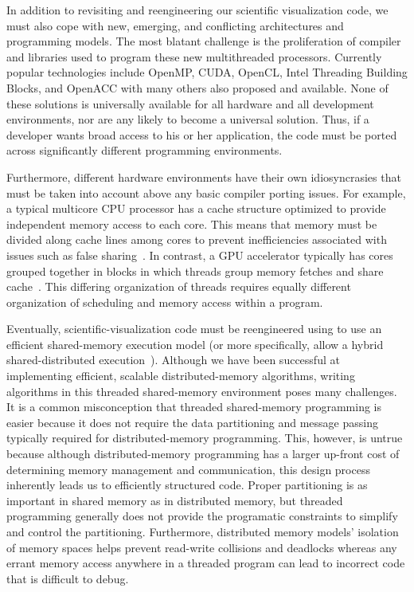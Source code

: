 \documentclass[conference]{IEEEtran}
\newcommand*{\lcite}[1]{~\cite{#1}}
\begin{document}
In addition to revisiting and reengineering our scientific visualization
code, we must also cope with new, emerging, and conflicting architectures
and programming models.  The most blatant challenge is the proliferation of
compiler and libraries used to program these new multithreaded processors.
Currently popular technologies include OpenMP, CUDA, OpenCL, Intel
Threading Building Blocks, and OpenACC with many others also proposed and
available.  None of these solutions is universally available for all
hardware and all development environments, nor are any likely to become a
universal solution.  Thus, if a developer wants broad access to his or her
application, the code must be ported across significantly different
programming environments.

Furthermore, different hardware environments have their own idiosyncrasies
that must be taken into account above any basic compiler porting issues.
For example, a typical multicore CPU processor has a cache structure
optimized to provide independent memory access to each core.  This means
that memory must be divided along cache lines among cores to prevent
inefficiencies associated with issues such as false sharing\lcite{TBB}.  In
contrast, a GPU accelerator typically has cores grouped together in blocks
in which threads group memory fetches and share cache\lcite{Sanders2011}.
This differing organization of threads requires equally different
organization of scheduling and memory access within a program.

Eventually, scientific-visualization code must be reengineered using to use
an efficient shared-memory execution model (or more specifically, allow a
hybrid shared-distributed execution\lcite{Li2008}).  Although we have been
successful at implementing efficient, scalable distributed-memory
algorithms, writing algorithms in this threaded shared-memory environment
poses many challenges.  It is a common misconception that threaded
shared-memory programming is easier because it does not require the data
partitioning and message passing typically required for distributed-memory
programming.  This, however, is untrue because although distributed-memory
programming has a larger up-front cost of determining memory management and
communication, this design process inherently leads us to efficiently
structured code.  Proper partitioning is as important in shared memory as
in distributed memory, but threaded programming generally does not provide
the programatic constraints to simplify and control the partitioning.
Furthermore, distributed memory models' isolation of memory spaces helps
prevent read-write collisions and deadlocks whereas any errant memory
access anywhere in a threaded program can lead to incorrect code that is
difficult to debug.
\end{document}
